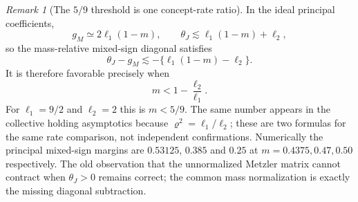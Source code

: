 \documentclass{article} %
\theoremstyle{plain}
\theoremstyle{definition}
\theoremstyle{remark}
\newtheorem{remark}[theorem]{Remark}
\begin{document}
\begin{remark}[The $5/9$ threshold is one concept-rate ratio]
\label{sbcouple:spectral-check}
In the ideal principal coefficients,
\[
 g_M\simeq2\ell_1(1-m),\qquad
 \theta_J\lesssim\ell_1(1-m)+\ell_2,
\]
so the mass-relative mixed-sign diagonal satisfies
\[
 \theta_J-g_M\lesssim-\{\ell_1(1-m)-\ell_2\}.
\]
It is therefore favorable precisely when
\[
 m<1-\frac{\ell_2}{\ell_1}.
\]
For $\ell_1=9/2$ and $\ell_2=2$ this is $m<5/9$.  The same number appears in
the collective holding asymptotics because
$\varrho^2=\ell_1/\ell_2$; these are two formulas for the same rate
comparison, not independent confirmations.  Numerically the principal
mixed-sign margins are $0.53125$, $0.385$ and $0.25$ at
$m=0.4375,0.47,0.50$ respectively.  The old observation that the unnormalized
Metzler matrix cannot contract when $\theta_J>0$ remains correct; the common
mass normalization is exactly the missing diagonal subtraction.
\end{remark}
\end{document}
